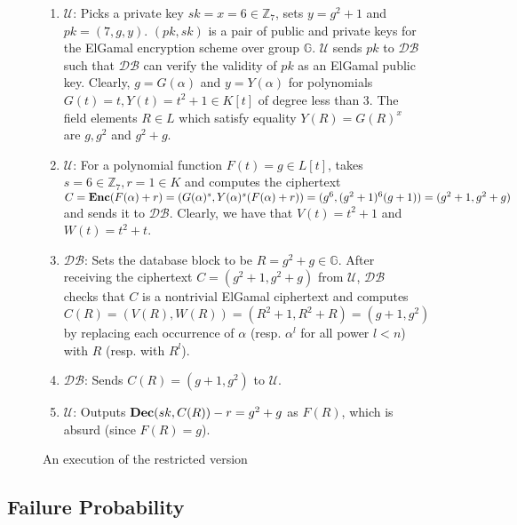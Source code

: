 \documentclass[JMC]{degruyter-journal}
\begin{document}
\begin{figure}[ghp]
\begin{center}
\begin{boxedminipage}{12cm}
\begin{enumerate}
\itemsep=-0.1cm
\item $\mathcal{U}$: Picks a private key $sk=x=6\in \mathbb{Z}_7$, sets $y=g^2 + 1$ and $pk=(7,g,y)$.
$(pk,sk)$ is a pair of public and private keys for  the ElGamal
encryption scheme over group $\mathbb{G}$.
 $\mathcal{U}$ sends $pk$ to
$\mathcal{DB}$ such that $\mathcal{DB}$ can verify the validity of
$pk$ as an ElGamal public key. Clearly, $g=G(\alpha)$ and
$y=Y(\alpha)$ for polynomials $G(t)=t, Y(t)=t^2+1\in K[t]$ of degree
less
 than 3.
The field elements $R\in L$ which satisfy  equality $Y(R)=G(R)^x$
are $g,g^2$ and $g^2+g$.
\item  $\mathcal{U}$:  For a polynomial function $F(t)=g\in L[t]$, takes $s=6\in \mathbb{Z}_7, r=1\in K$
and computes the ciphertext $C = {\bf Enc} (F (\alpha) + r) =
(G(\alpha)^{s} , Y (\alpha)^{s} (F (\alpha) + r))=(g^6,
(g^2+1)^6(g+1))=(g^2+1,g^2+g)$ and sends it to $\mathcal{DB}$.
Clearly,  we have that $V(t)=t^2+1$ and $W(t)=t^2+t$.
\item  $\mathcal{DB}$: Sets the database block to be $R=g^2+g\in \mathbb{G}$.  After receiving the
 ciphertext $C=(g^2+1,g^2+g)$ from $\mathcal{U}$, $\mathcal{DB}$ checks that $C$ is a  nontrivial
ElGamal ciphertext and computes $C(R) =
(V(R),W(R))=(R^2+1,R^2+R)=(g+1,g^2)$ by replacing each occurrence of
$\alpha$ (resp. $\alpha^{l}$ for all power $l< n$) with $R$
(resp. with $R^{l}$).
\item  $\mathcal{DB}$: Sends $C(R)=(g+1,g^2)$ to $\mathcal{U}$.
\item $\mathcal{U}$: Outputs ${\bf Dec}(sk,C(R))-r=g^2+g$ as $F(R)$, which is absurd (since $F(R)=g$).
\end{enumerate}
\end{boxedminipage}
\end{center}
\caption{An execution of the restricted version}
\label{fig:exeRV}
\end{figure}





\subsection{Failure Probability}\label{sec:notations}
\end{document}
